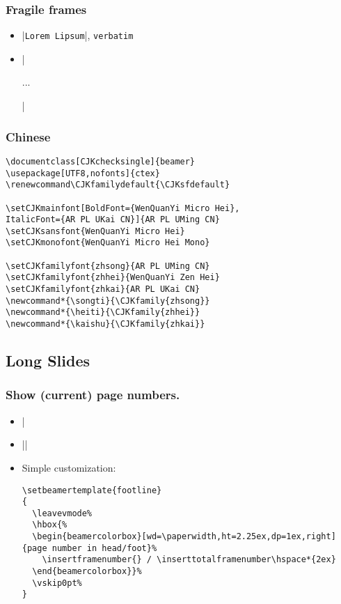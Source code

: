 \documentclass[CJKchecksingle]{beamer}
\newcommand{\env}[1]{\lstinline|#1|}
\begin{document}
\begin{frame}[fragile]\frametitle{Fragile frames}
  \begin{itemize}
    \item |\verb+Lorem Lipsum+|, \env{verbatim}
    \item |\begin{frame}[fragile] ... \end{frame}|
  \end{itemize}
\end{frame}

\begin{frame}[fragile]\frametitle{Chinese}

\begin{lstlisting}
\documentclass[CJKchecksingle]{beamer}
\usepackage[UTF8,nofonts]{ctex}
\renewcommand\CJKfamilydefault{\CJKsfdefault}

\setCJKmainfont[BoldFont={WenQuanYi Micro Hei},
ItalicFont={AR PL UKai CN}]{AR PL UMing CN}
\setCJKsansfont{WenQuanYi Micro Hei}
\setCJKmonofont{WenQuanYi Micro Hei Mono}

\setCJKfamilyfont{zhsong}{AR PL UMing CN}
\setCJKfamilyfont{zhhei}{WenQuanYi Zen Hei}
\setCJKfamilyfont{zhkai}{AR PL UKai CN}
\newcommand*{\songti}{\CJKfamily{zhsong}}
\newcommand*{\heiti}{\CJKfamily{zhhei}}
\newcommand*{\kaishu}{\CJKfamily{zhkai}}
\end{lstlisting}

\end{frame}

\subsection{Long Slides}
\begin{frame}[fragile]\frametitle{Show (current) page numbers.}
  \begin{itemize}
    \item | %
    \item ||
    \item Simple customization:
\begin{lstlisting}
\setbeamertemplate{footline}
{
  \leavevmode%
  \hbox{%
  \begin{beamercolorbox}[wd=\paperwidth,ht=2.25ex,dp=1ex,right]{page number in head/foot}%
    \insertframenumber{} / \inserttotalframenumber\hspace*{2ex}
  \end{beamercolorbox}}%
  \vskip0pt%
}
\end{lstlisting}
  \end{itemize}
\end{frame}
\end{document}
